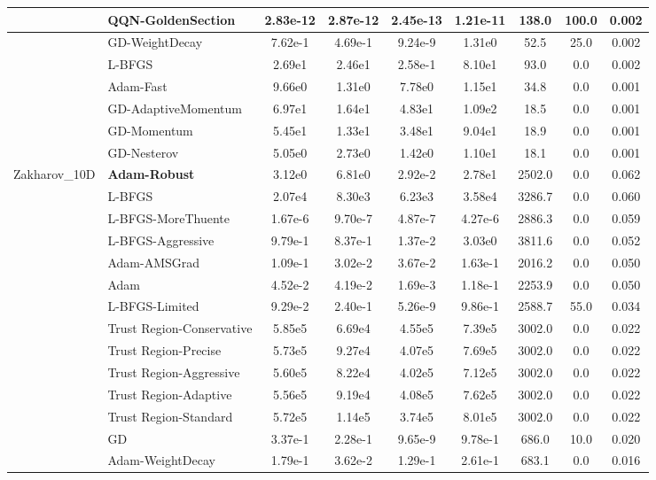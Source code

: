 \documentclass[10pt]{article}
\begin{document}
\begin{longtable}{|l|l|c|c|c|c|c|c|c|}
\hline
 & QQN-GoldenSection & 2.83e-12 & 2.87e-12 & 2.45e-13 & 1.21e-11 & 138.0 & 100.0 & 0.002 \\
\hline
 & GD-WeightDecay & 7.62e-1 & 4.69e-1 & 9.24e-9 & 1.31e0 & 52.5 & 25.0 & 0.002 \\
\hline
 & L-BFGS & 2.69e1 & 2.46e1 & 2.58e-1 & 8.10e1 & 93.0 & 0.0 & 0.002 \\
\hline
 & Adam-Fast & 9.66e0 & 1.31e0 & 7.78e0 & 1.15e1 & 34.8 & 0.0 & 0.001 \\
\hline
 & GD-AdaptiveMomentum & 6.97e1 & 1.64e1 & 4.83e1 & 1.09e2 & 18.5 & 0.0 & 0.001 \\
\hline
 & GD-Momentum & 5.45e1 & 1.33e1 & 3.48e1 & 9.04e1 & 18.9 & 0.0 & 0.001 \\
\hline
 & GD-Nesterov & 5.05e0 & 2.73e0 & 1.42e0 & 1.10e1 & 18.1 & 0.0 & 0.001 \\
Zakharov\_10D & \textbf{Adam-Robust} & 3.12e0 & 6.81e0 & 2.92e-2 & 2.78e1 & 2502.0 & 0.0 & 0.062 \\
\hline
 & L-BFGS & 2.07e4 & 8.30e3 & 6.23e3 & 3.58e4 & 3286.7 & 0.0 & 0.060 \\
\hline
 & L-BFGS-MoreThuente & 1.67e-6 & 9.70e-7 & 4.87e-7 & 4.27e-6 & 2886.3 & 0.0 & 0.059 \\
\hline
 & L-BFGS-Aggressive & 9.79e-1 & 8.37e-1 & 1.37e-2 & 3.03e0 & 3811.6 & 0.0 & 0.052 \\
\hline
 & Adam-AMSGrad & 1.09e-1 & 3.02e-2 & 3.67e-2 & 1.63e-1 & 2016.2 & 0.0 & 0.050 \\
\hline
 & Adam & 4.52e-2 & 4.19e-2 & 1.69e-3 & 1.18e-1 & 2253.9 & 0.0 & 0.050 \\
\hline
 & L-BFGS-Limited & 9.29e-2 & 2.40e-1 & 5.26e-9 & 9.86e-1 & 2588.7 & 55.0 & 0.034 \\
\hline
 & Trust Region-Conservative & 5.85e5 & 6.69e4 & 4.55e5 & 7.39e5 & 3002.0 & 0.0 & 0.022 \\
\hline
 & Trust Region-Precise & 5.73e5 & 9.27e4 & 4.07e5 & 7.69e5 & 3002.0 & 0.0 & 0.022 \\
\hline
 & Trust Region-Aggressive & 5.60e5 & 8.22e4 & 4.02e5 & 7.12e5 & 3002.0 & 0.0 & 0.022 \\
\hline
 & Trust Region-Adaptive & 5.56e5 & 9.19e4 & 4.08e5 & 7.62e5 & 3002.0 & 0.0 & 0.022 \\
\hline
 & Trust Region-Standard & 5.72e5 & 1.14e5 & 3.74e5 & 8.01e5 & 3002.0 & 0.0 & 0.022 \\
\hline
 & GD & 3.37e-1 & 2.28e-1 & 9.65e-9 & 9.78e-1 & 686.0 & 10.0 & 0.020 \\
\hline
 & Adam-WeightDecay & 1.79e-1 & 3.62e-2 & 1.29e-1 & 2.61e-1 & 683.1 & 0.0 & 0.016 \\

\end{longtable}
\end{document}
